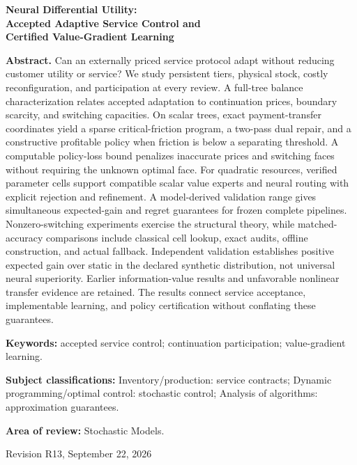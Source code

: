 \documentclass[11pt,letterpaper]{article}
\theoremstyle{definition}
\newcommand{\1}{\mathbf 1}
\begin{document}
\begin{titlepage}\centering
{\Large\bfseries Neural Differential Utility:\\ Accepted Adaptive Service Control and\\ Certified Value-Gradient Learning\par}
\vspace{.3in}{Anonymous manuscript for Operations Research\par}\vspace{.25in}
\begin{minipage}{\textwidth}
\textbf{Abstract.}
Can an externally priced service protocol adapt without reducing customer utility or service? We study persistent tiers, physical stock, costly reconfiguration, and participation at every review. A full-tree balance characterization relates accepted adaptation to continuation prices, boundary scarcity, and switching capacities. On scalar trees, exact payment-transfer coordinates yield a sparse critical-friction program, a two-pass dual repair, and a constructive profitable policy when friction is below a separating threshold. A computable policy-loss bound penalizes inaccurate prices and switching faces without requiring the unknown optimal face. For quadratic resources, verified parameter cells support compatible scalar value experts and neural routing with explicit rejection and refinement. A model-derived validation range gives simultaneous expected-gain and regret guarantees for frozen complete pipelines. Nonzero-switching experiments exercise the structural theory, while matched-accuracy comparisons include classical cell lookup, exact audits, offline construction, and actual fallback. Independent validation establishes positive expected gain over static in the declared synthetic distribution, not universal neural superiority. Earlier information-value results and unfavorable nonlinear transfer evidence are retained. The results connect service acceptance, implementable learning, and policy certification without conflating these guarantees.
\par\vspace{.16in}\textbf{Keywords:} accepted service control; continuation participation; value-gradient learning.
\par\vspace{.10in}\textbf{Subject classifications:} Inventory/production: service contracts; Dynamic programming/optimal control: stochastic control; Analysis of algorithms: approximation guarantees.
\par\vspace{.10in}\textbf{Area of review:} Stochastic Models.
\end{minipage}\vfill{Revision R13, September 22, 2026\par}\end{titlepage}
\end{document}
